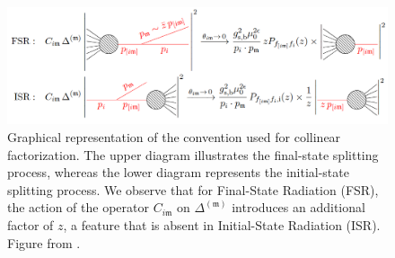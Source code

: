 \documentclass[a4paper, 12pt]{book}
\newcommand{\um}{\mathfrak{m}}
\begin{document}
\begin{figure}[!ht]
	\centering
	\includegraphics[width=1.0\textwidth]{imgs/splitting.png}
	\caption{Graphical representation of the convention used for collinear factorization. The upper diagram illustrates the final-state splitting process, whereas the lower diagram represents the initial-state splitting process. We observe that for Final-State Radiation (FSR), the action of the operator $C_{i\um}$ on $\Delta^{(\um)}$ introduces an additional factor of $z$, a feature that is absent in Initial-State Radiation (ISR). Figure from \cite{Devoto:2025kin}.}
	\label{hadron-collision}
\end{figure}
\end{document}
